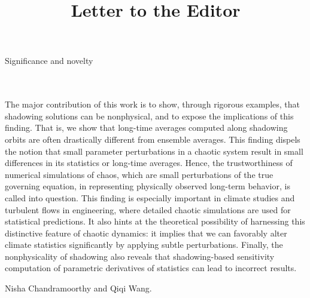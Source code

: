 \documentclass{letter}
\title{Letter to the Editor}
\begin{document}
\hspace{1.6in} 
\begin{large}{Significance and novelty}\end{large}
\\
\\

The major contribution of this work is to show, through rigorous examples, that shadowing solutions can be nonphysical, and to expose the implications of this finding. That is, we show that long-time averages computed along shadowing orbits are often drastically different from ensemble averages. This finding dispels the notion that small parameter perturbations in
a chaotic system result in small differences in its statistics or long-time averages. Hence, the trustworthiness of numerical simulations of chaos, which are small perturbations of the true governing equation, in representing physically observed long-term behavior, is called into question. This finding is especially important in climate studies and turbulent flows in engineering, where detailed chaotic simulations are used for statistical predictions. It also hints at the theoretical possibility of harnessing this distinctive feature of chaotic dynamics: it implies that we can favorably alter climate statistics significantly by applying subtle perturbations. Finally, the nonphysicality of shadowing also reveals that shadowing-based sensitivity computation of parametric derivatives of statistics can lead to incorrect results. 


Nisha Chandramoorthy and Qiqi Wang.
\end{document}
